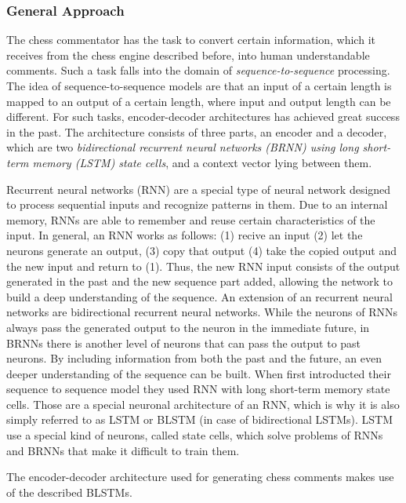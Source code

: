 \subsubsection{General Approach}

The chess commentator has the task to convert certain information, which it receives from the chess engine described before, into human understandable comments. Such a task falls into the domain of \textit{sequence-to-sequence} processing. The idea of sequence-to-sequence models are that an input of a certain length is mapped to an output of a certain length, where input and output length can be different. For such tasks, encoder-decoder architectures has achieved great success in the past. The architecture consists of three parts, an encoder and a decoder, which are two \textit{bidirectional recurrent neural networks (BRNN) using long short-term memory (LSTM) state cells}, and a context vector lying between them.

Recurrent neural networks (RNN) are a special type of neural network designed to process sequential inputs and recognize patterns in them. Due to an internal memory, RNNs are able to remember and reuse certain characteristics of the input. In general, an RNN works as follows: (1) recive an input (2) let the neurons generate an output, (3) copy that output (4) take the copied output and the new input and return to (1). Thus, the new RNN input consists of the output generated in the past and the new sequence part added, allowing the network to build a deep understanding of the sequence. An extension of an recurrent neural networks are bidirectional recurrent neural networks. While the neurons of RNNs always pass the generated output to the neuron in the immediate future, in BRNNs there is another level of neurons that can pass the output to past neurons. By including information from both the past and the future, an even deeper understanding of the sequence can be built. When \citep{Sutskever-2014-sts} first introducted their sequence to sequence model they used RNN with long short-term memory state cells. Those are a special neuronal architecture of an RNN, which is why it is also simply referred to as LSTM or BLSTM (in case of bidirectional LSTMs). LSTM use a special kind of neurons, called state cells, which solve problems of RNNs and BRNNs that make it difficult to train them.

The encoder-decoder architecture used for generating chess comments makes use of the described BLSTMs.